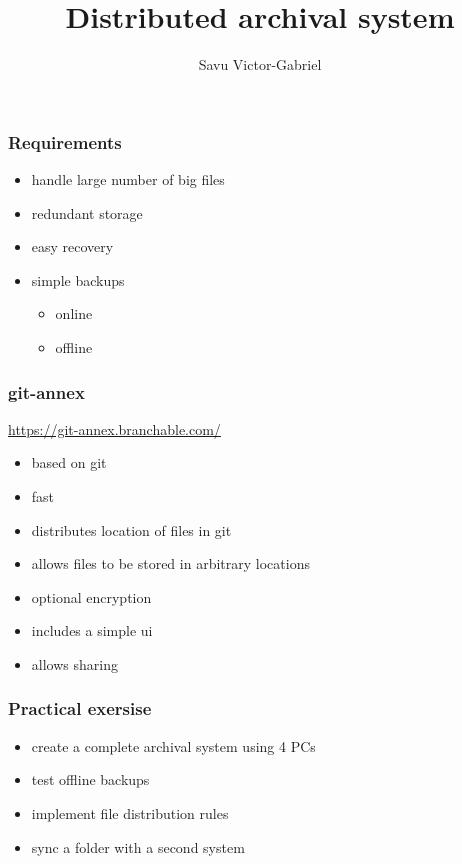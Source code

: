 \documentclass{beamer}
\title{Distributed archival system}
\author{Savu Victor-Gabriel}
\institute{TUM}
\begin{document}
	\frame{\titlepage}
	
	\begin{frame}
		\frametitle{Requirements}
		
		\begin{itemize}
			\item handle large number of big files
			\item redundant storage
			\item easy recovery
			\item simple backups
				\begin{itemize}
					\item online
					\item offline
				\end{itemize}
		\end{itemize}
	\end{frame}
	
	\begin{frame}
		\frametitle{git-annex}
		
		\url{https://git-annex.branchable.com/}
		
		\begin{itemize}
			\item based on git
			\item fast
			\item distributes location of files in git
			\item allows files to be stored in arbitrary locations
			\item optional encryption
			\item includes a simple ui
			\item allows sharing
		\end{itemize}
	\end{frame}
	
	\begin{frame}
		\frametitle{Practical exersise}
		
		\begin{itemize}
			\item create a complete archival system using 4 PCs
			\item test offline backups
			\item implement file distribution rules
			\item sync a folder with a second system
		\end{itemize}
	\end{frame}
\end{document}
